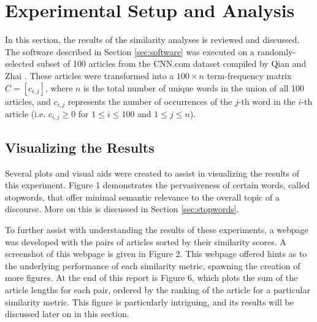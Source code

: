 \documentclass[11pt]{article}
\begin{document}
\section{Experimental Setup and Analysis} \label{sec:experiments}

In this section, the results of the similarity analyses is reviewed and discussed.
The software described in Section \ref{sec:software} was executed on a randomly-selected subset of 100 articles from the CNN.com dataset compiled by Qian and Zhai \cite{qian2014unsupervised}.
These articles were transformed into a $100 \times n$ term-frequency matrix $C = [ c_{i,j} ]$, where $n$ is the total number of unique words in the union of all 100 articles, and $c_{i,j}$ represents the number of occurrences of the $j$-th word in the $i$-th article (i.e. $c_{i,j} \ge 0$ for $1 \le i \le 100$ and $1 \le j \le n$).


\subsection{Visualizing the Results}

Several plots and visual aids were created to assist in visualizing the results of this experiment.
Figure 1 demonstrates the pervasiveness of certain words, called stopwords, that offer minimal semantic relevance to the overall topic of a discourse.
More on this is discussed in Section \ref{sec:stopwords}.

To further assist with understanding the results of these experiments, a webpage was developed with the pairs of articles sorted by their similarity scores.
A screenshot of this webpage is given in Figure 2.
This webpage offered hints as to the underlying performance of each similarity metric, spawning the creation of more figures.
At the end of this report is Figure 6, which plots the sum of the article lengths for each pair, ordered by the ranking of the article for a particular similarity metric.
This figure is particularly intriguing, and its results will be discussed later on in this section.
\end{document}

